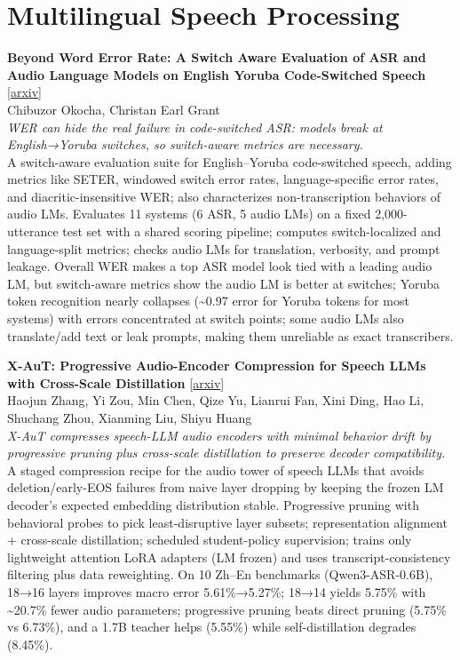 \documentclass[12pt,letterpaper]{article}
\begin{document}
\medskip


\section*{Multilingual Speech Processing}

{\small\textbf{Beyond Word Error Rate: A Switch Aware Evaluation of ASR and Audio Language Models on English Yoruba Code-Switched Speech}} {\scriptsize[\href{https://arxiv.org/abs/2609.11786}{arxiv}]}\\
{\scriptsize Chibuzor Okocha, Christan Earl Grant}\\

{\small\textit{WER can hide the real failure in code-switched ASR: models break at English→Yoruba switches, so switch-aware metrics are necessary.}}\\[1pt]
{\footnotesize A switch-aware evaluation suite for English--Yoruba code-switched speech, adding metrics like SETER, windowed switch error rates, language-specific error rates, and diacritic-insensitive WER; also characterizes non-transcription behaviors of audio LMs. Evaluates 11 systems (6 ASR, 5 audio LMs) on a fixed 2,000-utterance test set with a shared scoring pipeline; computes switch-localized and language-split metrics; checks audio LMs for translation, verbosity, and prompt leakage. Overall WER makes a top ASR model look tied with a leading audio LM, but switch-aware metrics show the audio LM is better at switches; Yoruba token recognition nearly collapses (\textasciitilde{}0.97 error for Yoruba tokens for most systems) with errors concentrated at switch points; some audio LMs also translate/add text or leak prompts, making them unreliable as exact transcribers.}

\medskip

{\small\textbf{X-AuT: Progressive Audio-Encoder Compression for Speech LLMs with Cross-Scale Distillation}} {\scriptsize[\href{https://arxiv.org/abs/2609.11412}{arxiv}]}\\
{\scriptsize Haojun Zhang, Yi Zou, Min Chen, Qize Yu, Lianrui Fan, Xini Ding, Hao Li, Shuchang Zhou, Xianming Liu, Shiyu Huang}\\

{\small\textit{X-AuT compresses speech-LLM audio encoders with minimal behavior drift by progressive pruning plus cross-scale distillation to preserve decoder compatibility.}}\\[1pt]
{\footnotesize A staged compression recipe for the audio tower of speech LLMs that avoids deletion/early-EOS failures from naive layer dropping by keeping the frozen LM decoder's expected embedding distribution stable. Progressive pruning with behavioral probes to pick least-disruptive layer subsets; representation alignment + cross-scale distillation; scheduled student-policy supervision; trains only lightweight attention LoRA adapters (LM frozen) and uses transcript-consistency filtering plus data reweighting. On 10 Zh--En benchmarks (Qwen3-ASR-0.6B), 18→16 layers improves macro error 5.61\%→5.27\%; 18→14 yields 5.75\% with \textasciitilde{}20.7\% fewer audio parameters; progressive pruning beats direct pruning (5.75\% vs 6.73\%), and a 1.7B teacher helps (5.55\%) while self-distillation degrades (8.45\%).}
\end{document}
